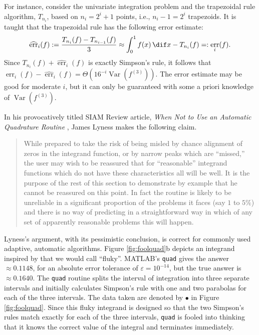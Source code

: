\documentclass[]{elsarticle}
\DeclareMathOperator{\Var}{Var}
\DeclareMathOperator{\err}{err}
\newcommand{\herr}{\widehat{\err}}
\theoremstyle{definition}
\theoremstyle{remark}
\begin{document}
For instance, consider the univariate integration problem and the trapezoidal rule algorithm, $T_{n_i}$, based on $n_i=2^i+1$ points, i.e., $n_i-1=2^i$ trapezoids.  It is taught that the trapezoidal rule has the following error estimate:
\begin{equation} \label{traperrest}
\herr_i(f):=\frac{T_{n_{i}}(f)-T_{n_{i-1}}(f)}{3} \approx \int_0^1 f(x) \, \dif x - T_{n_i}(f) =:\err_i(f).
\end{equation}
Since $T_{n_i}(f)+ \herr_i(f)$ is exactly Simpson's rule, it follows that $\err_i(f) -\herr_i(f) = \Theta(16^{-i} \Var(f^{(3)}))$.  The error estimate may be good for moderate $i$, but it can only be guaranteed with some a priori knowledge of $\Var(f^{(3)})$.

In his provocatively titled SIAM Review article, \emph{When Not to Use an Automatic Quadrature Routine} \cite[p.\ 69]{Lyn83}, James Lyness makes the following claim.
\begin{quote}
While prepared to take the risk of being misled by chance alignment of zeros in the integrand function, or by narrow peaks which are ``missed,'' the user may wish to be reassured that for ``reasonable'' integrand functions which do not have these characteristics all will be well. It is the purpose of the rest of this section to demonstrate by example that he cannot be reassured on this point. In fact the routine is likely to be unreliable in a significant proportion of the problems it faces (say $1$ to $5\%$) and there is no way of predicting in a straightforward way in which of any set of apparently reasonable problems this will happen.
\end{quote}

Lyness's argument, with its pessimistic conclusion, is correct for commonly used adaptive, automatic algorithms.  Figure \ref{fig:foolquad}b depicts an integrand inspired by \cite{Lyn83} that we would call ``fluky''.  MATLAB's {\tt quad} gives the answer $\approx 0.1148$, for an absolute error tolerance of $\varepsilon=10^{-14}$, but the true answer is $\approx 0.1640$.  The {\tt quad} routine splits the interval of integration into three separate intervals and initially calculates Simpson's rule with one and two parabolas for each of the three intervals.  The data taken are denoted by $\bullet$ in Figure \ref{fig:foolquad}.  Since this fluky integrand is designed so that the two Simpson's rules match exactly for each of the three intervals, {\tt quad} is fooled into thinking that it knows the correct value of the integral and terminates immediately.
   
\end{document}
